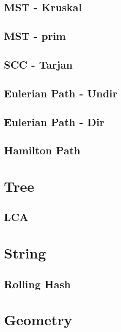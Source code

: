 \documentclass[twocolumn]{article}
\begin{document}
\subsection{MST - Kruskal}


\subsection{MST - prim}


\subsection{SCC - Tarjan}


\subsection{Eulerian Path - Undir}


\subsection{Eulerian Path - Dir}


\subsection{Hamilton Path}


\section{Tree}

\subsection{LCA}


\section{String}

\subsection{Rolling Hash}


\section{Geometry}
\end{document}
